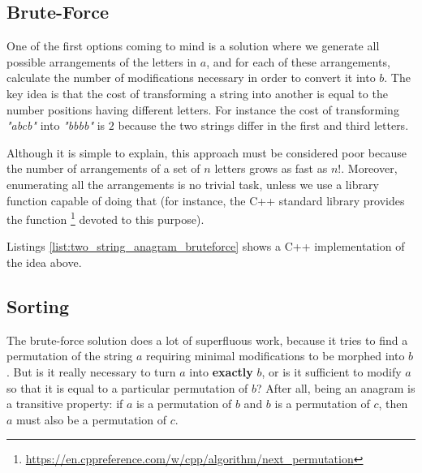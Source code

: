 \subsection{Brute-Force}
\label{sec:anagrams:bruteforce}

One of the first options coming to mind is a solution where we generate all possible arrangements of the letters in $a$, and
for each of these arrangements, calculate the number of modifications necessary in order to convert it into $b$. 
The key idea is that the cost of transforming a string into
another is equal to the number positions having different letters. 
For instance the cost of transforming \textit{"abcb"}
into \textit{"bbbb"} is $2$ because the two strings differ in the first and third letters. 

Although it is simple to explain, this approach must be considered poor because the number
of arrangements of a set of $n$ letters grows as fast as $n!$.
Moreover, enumerating all the arrangements is no trivial task, unless we use a  library function capable of doing that (for instance, the C++ standard library provides the function \footnote{\href{https://en.cppreference.com/w/cpp/algorithm/next_permutation}{https://en.cppreference.com/w/cpp/algorithm/next\_permutation}} devoted to this purpose).

Listings \ref{list:two_string_anagram_bruteforce} shows a C++ implementation of the idea above.




\subsection{Sorting}
\label{sec:anagrams:sorting}

The brute-force solution does a lot of superfluous work, because it tries to find a permutation of the string $a$
requiring minimal modifications to be morphed into $b$.
But is it really necessary to turn $a$ into \textbf{exactly} $b$, or is it sufficient to modify $a$ so that it is equal to a particular permutation of $b$? 
After all, being an anagram is a transitive property: if $a$ is a permutation of $b$ and $b$ is a permutation of $c$, then $a$ must also be a permutation of $c$. 

